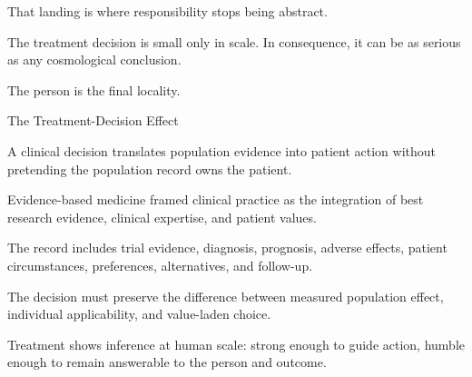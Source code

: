 That landing is where responsibility stops being abstract.

The treatment decision is small only in scale. In consequence, it can be as
serious as any cosmological conclusion.

The person is the final locality.

\begin{phenom}{The Treatment-Decision Effect~\cite{sackett1996}}
\label{ph:treatment-decision}

\PhStatement
A clinical decision translates population evidence into patient action without
pretending the population record owns the patient.

\PhOrigin
Evidence-based medicine framed clinical practice as the integration of best
research evidence, clinical expertise, and patient values.

\PhObservation
The record includes trial evidence, diagnosis, prognosis, adverse effects,
patient circumstances, preferences, alternatives, and follow-up.

\PhConstraint
The decision must preserve the difference between measured population effect,
individual applicability, and value-laden choice.

\PhConsequence
Treatment shows inference at human scale: strong enough to guide action,
humble enough to remain answerable to the person and outcome.
\end{phenom}

